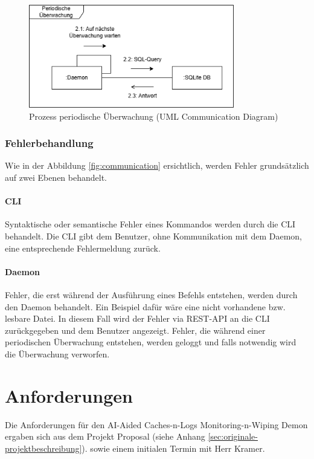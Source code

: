 \documentclass[a4paper,12pt]{report}
\begin{document}
    \begin{figure}[h]
        \centering
        \includegraphics[width=0.8\textwidth]{assets/communication-scheduler}
        \caption{Prozess periodische Überwachung (UML Communication Diagram)}
        \label{fig:communication-scheduler}
    \end{figure}

    \subsubsection{Fehlerbehandlung}
    Wie in der Abbildung \ref{fig:communication} ersichtlich, werden Fehler grundsätzlich auf zwei Ebenen behandelt.

    \paragraph*{CLI}
    Syntaktische oder semantische Fehler eines Kommandos werden durch die CLI behandelt.
    Die CLI gibt dem Benutzer, ohne Kommunikation mit dem Daemon, eine entsprechende Fehlermeldung zurück.

    \paragraph*{Daemon}
    Fehler, die erst während der Ausführung eines Befehls entstehen, werden durch den Daemon behandelt.
    Ein Beispiel dafür wäre eine nicht vorhandene bzw. lesbare Datei.
    In diesem Fall wird der Fehler via REST-API an die CLI zurückgegeben und dem Benutzer angezeigt.
    Fehler, die während einer periodischen Überwachung entstehen, werden geloggt und falls notwendig wird die Überwachung verworfen.

    \clearpage


    \section{Anforderungen}\label{sec:anforderungen}
    Die Anforderungen für den AI-Aided Caches-n-Logs Monitoring-n-Wiping Demon ergaben sich aus dem Projekt Proposal (siehe Anhang \ref{sec:originale-projektbeschreibung}).
    sowie einem initialen Termin mit Herr Kramer.
\end{document}
